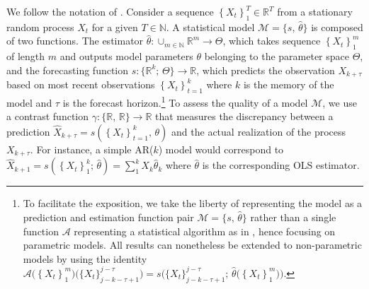 \documentclass[11pt,dvipsnames]{article}
\begin{document}
We follow the notation of \citet{arlotSurveyCrossvalidationProcedures2010}.
Consider a sequence $ \left\lbrace X_{t} \right\rbrace_{1}^{T} \in \mathbb{R}^{T} $ from a stationary random process $ X_{t} $ for a given $ T \in \mathbb{N}$.
A statistical model $ \mathcal{M} = \lbrace s,\, \widehat{\theta} \rbrace $ is composed of two functions.
The estimator $ \widehat{\theta}:\cup_{m \in \mathbb{N}} \mathbb{R}^{m}\rightarrow \Theta $, which takes sequence $\left\lbrace X_{t} \right\rbrace_{1}^{m}$ of length $m$ and outputs model parameters $\theta$ belonging to the parameter space $\Theta$,
and the forecasting function $ s:\lbrace  \mathbb{R}^{k};\, \Theta \rbrace \rightarrow \mathbb{R}$, which predicts the observation $X_{k+\tau}$ based on most recent observations $\left\lbrace X_{t} \right\rbrace_{t=1}^{k}$ where $k$ is the memory of the model and $\tau$ is the forecast horizon.\footnote{
  To facilitate the exposition, we take the liberty of representing the model as a prediction and estimation function pair $ \mathcal{M} = \lbrace s,\, \widehat{\theta} \rbrace $ rather than a single function $ \mathcal{A} $ representing a statistical algorithm as in \citet{arlotSurveyCrossvalidationProcedures2010}, hence focusing on parametric models.
  All results can nonetheless be extended to non-parametric models by using the identity $ \mathcal{A}\big( \left\lbrace X_{t} \right\rbrace_{1}^{m}\big)\big( \lbrace X_{t} \rbrace_{j-k-\tau+1}^{j-\tau} \big)  =s\big(\lbrace X_{t} \rbrace_{j-k-\tau+1}^{j-\tau} ;\,\widehat{\theta}\big( \left\lbrace X_{t} \right\rbrace_{1}^{m} \big) \big)   $.
}
To assess the quality of a model $ \mathcal{M}  $, we use a contrast function $ \gamma: \lbrace  \mathbb{R},\, \mathbb{R} \rbrace  \rightarrow \mathbb{R}$ that measures the discrepancy between a prediction $\hat{X}_{k+\tau} = s(\left\lbrace X_{t} \right\rbrace_{t=1}^{k},\, \theta) $ and the actual realization of the process $X_{k+\tau}$. 
For instance, a simple AR($ k $) model would correspond to  $ \widehat{X}_{k+1} = s(\left\lbrace X_{t} \right\rbrace_{1}^{k};\, \widehat{\theta}) = \sum_{1}^{k} X_{k} \widehat{\theta}_{k}$ where $ \widehat{\theta} $ is the corresponding OLS estimator.
\end{document}
